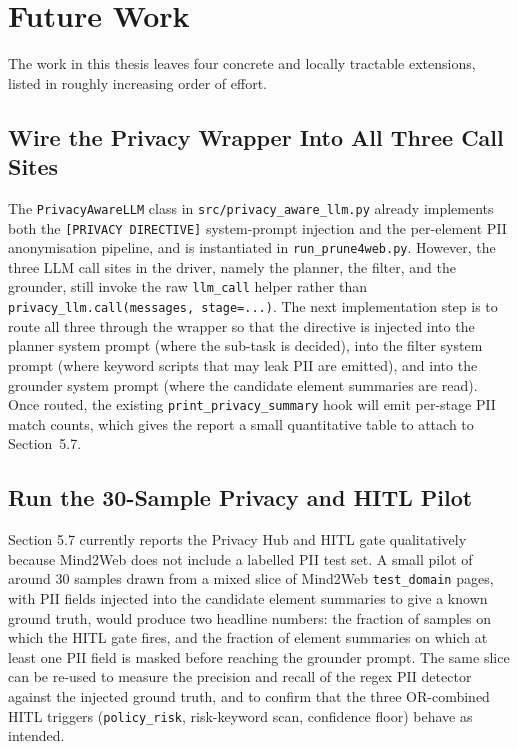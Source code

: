 \section{Future Work}

The work in this thesis leaves four concrete and locally tractable extensions, listed in roughly increasing order of effort.

\subsection{Wire the Privacy Wrapper Into All Three Call Sites}
The \texttt{PrivacyAwareLLM} class in \texttt{src/privacy\_aware\_llm.py} already implements both the \texttt{[PRIVACY DIRECTIVE]} system-prompt injection and the per-element PII anonymisation pipeline, and is instantiated in \texttt{run\_prune4web.py}. However, the three LLM call sites in the driver, namely the planner, the filter, and the grounder, still invoke the raw \texttt{llm\_call} helper rather than \texttt{privacy\_llm.call(messages, stage=...)}. The next implementation step is to route all three through the wrapper so that the directive is injected into the planner system prompt (where the sub-task is decided), into the filter system prompt (where keyword scripts that may leak PII are emitted), and into the grounder system prompt (where the candidate element summaries are read). Once routed, the existing \texttt{print\_privacy\_summary} hook will emit per-stage PII match counts, which gives the report a small quantitative table to attach to Section~5.7.

\subsection{Run the 30-Sample Privacy and HITL Pilot}
Section 5.7 currently reports the Privacy Hub and HITL gate qualitatively because Mind2Web does not include a labelled PII test set. A small pilot of around 30 samples drawn from a mixed slice of Mind2Web \texttt{test\_domain} pages, with PII fields injected into the candidate element summaries to give a known ground truth, would produce two headline numbers: the fraction of samples on which the HITL gate fires, and the fraction of element summaries on which at least one PII field is masked before reaching the grounder prompt. The same slice can be re-used to measure the precision and recall of the regex PII detector against the injected ground truth, and to confirm that the three OR-combined HITL triggers (\texttt{policy\_risk}, risk-keyword scan, confidence floor) behave as intended.

